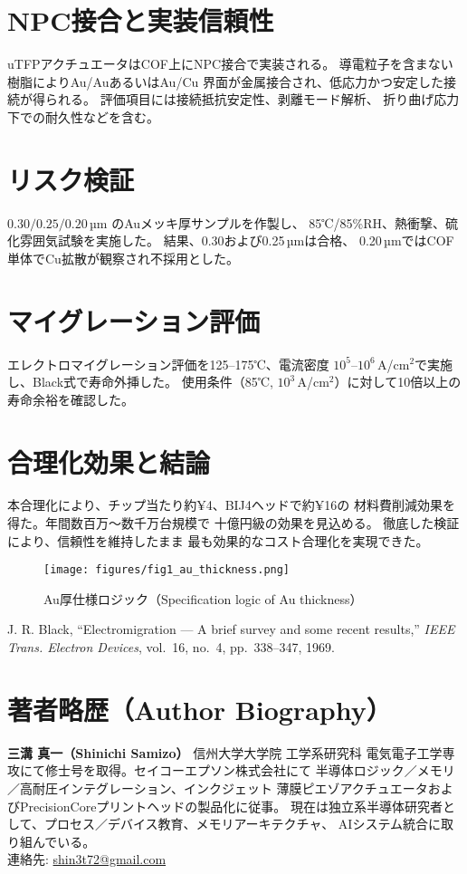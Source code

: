 \documentclass[a4paper,12pt]{article}
\begin{document}
\section{NPC接合と実装信頼性}
uTFPアクチュエータはCOF上にNPC接合で実装される。
導電粒子を含まない樹脂によりAu/AuあるいはAu/Cu
界面が金属接合され、低応力かつ安定した接続が得られる。
評価項目には接続抵抗安定性、剥離モード解析、
折り曲げ応力下での耐久性などを含む。

\section{リスク検証}
$0.30/0.25/0.20$\,µm のAuメッキ厚サンプルを作製し、
85℃/85\%RH、熱衝撃、硫化雰囲気試験を実施した。
結果、0.30および0.25\,µmは合格、
0.20\,µmではCOF単体でCu拡散が観察され不採用とした。

\section{マイグレーション評価}
エレクトロマイグレーション評価を125--175℃、電流密度
$10^5$--$10^6$\,A/cm$^2$で実施し、Black式で寿命外挿した。
使用条件（85℃, $10^3$\,A/cm$^2$）に対して10倍以上の寿命余裕を確認した。

\section{合理化効果と結論}
本合理化により、チップ当たり約¥4、BIJ4ヘッドで約¥16の
材料費削減効果を得た。年間数百万〜数千万台規模で
十億円級の効果を見込める。
徹底した検証により、信頼性を維持したまま
最も効果的なコスト合理化を実現できた。

\begin{figure}[h]
  \centering
  \texttt{[image: figures/fig1\_au\_thickness.png]}
  \caption{Au厚仕様ロジック（Specification logic of Au thickness）}
  \label{fig:au}
\end{figure}

\begin{thebibliography}{9}
J. R. Black, ``Electromigration --- A brief survey and some recent results,''
\emph{IEEE Trans. Electron Devices}, vol.~16, no.~4, pp.~338--347, 1969.
\end{thebibliography}

\section*{著者略歴（Author Biography）}
\textbf{三溝 真一（Shinichi Samizo）} 信州大学大学院 工学系研究科
電気電子工学専攻にて修士号を取得。セイコーエプソン株式会社にて
半導体ロジック／メモリ／高耐圧インテグレーション、インクジェット
薄膜ピエゾアクチュエータおよびPrecisionCoreプリントヘッドの製品化に従事。
現在は独立系半導体研究者として、プロセス／デバイス教育、メモリアーキテクチャ、
AIシステム統合に取り組んでいる。\\
連絡先: \href{mailto:shin3t72@gmail.com}{shin3t72@gmail.com}
\end{document}
